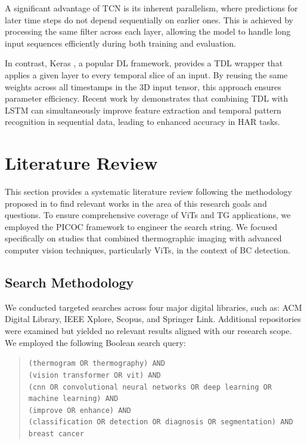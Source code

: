 \documentclass[runningheads]{llncs}
\begin{document}
A significant advantage of \ac{TCN} is its inherent parallelism, where
predictions for later time steps do not depend sequentially on earlier
ones. This is achieved by processing the same filter across each
layer, allowing the model to handle long input sequences efficiently
during both training and evaluation.

In contrast, Keras \cite{chollet2015keras}, a popular \ac{DL}
framework, provides a \ac{TDL} wrapper that applies a given layer to
every temporal slice of an input. By reusing the same weights across
all timestamps in the 3D input tensor, this approach ensures parameter
efficiency. Recent work by \cite{Dhage2025} demonstrates that
combining \ac{TDL} with LSTM can simultaneously improve feature
extraction and temporal pattern recognition in sequential data,
leading to enhanced accuracy in \ac{HAR} tasks.


\section{Literature Review}
\label{sec:literature-review}
This section provides a systematic literature review following the
methodology proposed in \cite{kitchenham2009systematic} to find
relevant works in the area of this research goals and questions.
To ensure comprehensive coverage of \ac{ViTs} and \ac{TG} applications, we
employed the \ac{PICOC} framework to engineer the search string. We focused
specifically on studies that combined thermographic imaging with
advanced computer vision techniques, particularly \ac{ViTs}, in the context of \ac{BC} detection.

\subsection{Search Methodology}
\label{sec:search-methodology}

We conducted targeted searches across four major digital libraries,
such as: ACM Digital Library, IEEE Xplore, Scopus, and Springer
Link. Additional repositories were examined but yielded no relevant
results aligned with our research scope. We employed the following
Boolean search query:

\begin{quote}
  \scriptsize
\texttt{(thermogram OR thermography) AND} \\
\texttt{(vision transformer OR vit) AND} \\
\texttt{(cnn OR convolutional neural networks OR deep learning OR machine learning) AND} \\
\texttt{(improve OR enhance) AND} \\
\texttt{(classification OR detection OR diagnosis OR segmentation) AND} \\
\texttt{breast cancer}
\end{quote} 
\end{document}
